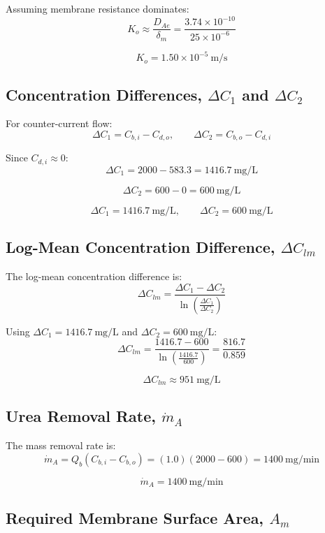 \documentclass[10.5pt]{article}
\begin{document}
Assuming membrane resistance dominates:
\[
    K_o \approx \frac{D_{Ae}}{\delta_m}
    = \frac{3.74 \times 10^{-10}}{25 \times 10^{-6}}
\]

\[
    \boxed{K_o=1.50 \times 10^{-5} \ \text{m/s}}
\]

\subsection{Concentration Differences, $\Delta C_1$ and $\Delta C_2$}

For counter-current flow:
\[
    \Delta C_1 = C_{b,i}-C_{d,o},
    \qquad
    \Delta C_2 = C_{b,o}-C_{d,i}
\]

Since $C_{d,i}\approx 0$:
\[
    \Delta C_1 = 2000-583.3 = 1416.7 \ \text{mg/L}
\]

\[
    \Delta C_2 = 600-0 = 600 \ \text{mg/L}
\]

\[
    \boxed{\Delta C_1=1416.7 \ \text{mg/L}},
    \qquad
    \boxed{\Delta C_2=600 \ \text{mg/L}}
\]

\subsection{Log-Mean Concentration Difference, $\Delta C_{lm}$}

The log-mean concentration difference is:
\[
    \Delta C_{lm}
    =
    \frac{\Delta C_1-\Delta C_2}
    {\ln\left(\frac{\Delta C_1}{\Delta C_2}\right)}
\]

Using $\Delta C_1=1416.7 \ \text{mg/L}$ and $\Delta C_2=600 \ \text{mg/L}$:
\[
    \Delta C_{lm}
    =
    \frac{1416.7-600}
    {\ln\left(\frac{1416.7}{600}\right)}
    =
    \frac{816.7}{0.859}
\]

\[
    \boxed{\Delta C_{lm} \approx 951 \ \text{mg/L}}
\]

\subsection{Urea Removal Rate, $\dot{m}_A$}

The mass removal rate is:
\[
    \dot{m}_A = Q_b(C_{b,i}-C_{b,o})
    = (1.0)(2000-600)
    = 1400 \ \text{mg/min}
\]

\[
    \boxed{\dot{m}_A = 1400 \ \text{mg/min}}
\]

\subsection{Required Membrane Surface Area, $A_m$}
\end{document}
